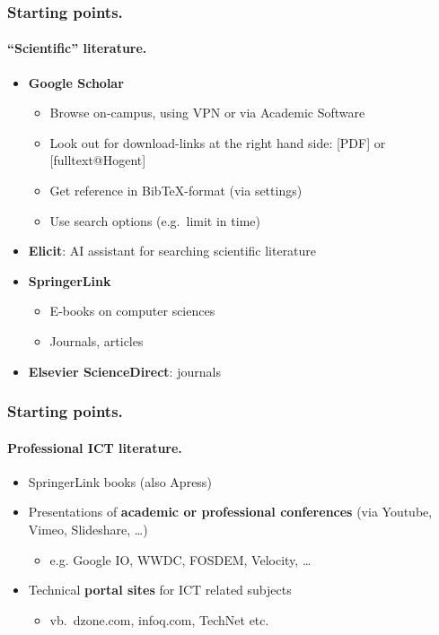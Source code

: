 \documentclass[aspectratio=169]{beamer}
\begin{document}
\begin{frame}
    \frametitle{Starting points.}
    \framesubtitle{``Scientific'' literature.}

    \begin{itemize}
        \item<+-> \textbf{Google Scholar}
            \begin{itemize}
                \item Browse on-campus, using VPN or via Academic Software
                \item Look out for download-links at the right hand side: [PDF] or [fulltext@Hogent]
                \item Get reference in Bib{\TeX}-format (via settings)
                \item Use search options (e.g.~limit in time)
            \end{itemize}
        \item<+-> \textbf{Elicit}: AI assistant for searching scientific literature
        \item<+-> \textbf{SpringerLink}
            \begin{itemize}
                \item E-books on computer sciences
                \item Journals, articles
            \end{itemize}
        \item<+-> \textbf{Elsevier ScienceDirect}: journals
    \end{itemize}
\end{frame}

\begin{frame}
    \frametitle{Starting points.}
    \framesubtitle{Professional ICT literature.}

    \begin{itemize}
        \item SpringerLink books (also Apress)
        \item Presentations of \textbf{academic or professional conferences} (via Youtube, Vimeo, Slideshare, \dots)
              \begin{itemize}
                  \item e.g. Google IO, WWDC, FOSDEM, Velocity, \dots
              \end{itemize}
        \item<+-> Technical \textbf{portal sites} for ICT related subjects
            \begin{itemize}
                \item vb.~dzone.com, infoq.com, TechNet etc.
            \end{itemize}
    \end{itemize}
\end{frame}
\end{document}

